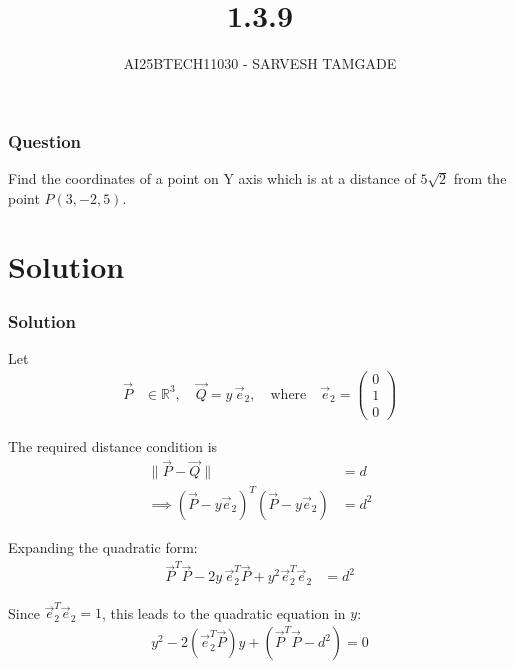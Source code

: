 \documentclass{beamer}
\title{1.3.9}
\author{AI25BTECH11030 - SARVESH TAMGADE}
\theoremstyle{remark}
\numberwithin{equation}{section}
\numberwithin{equation}{section}
\begin{document}
\begin{frame}
\titlepage
\end{frame}

\begin{frame}
\frametitle{Question}

Find the coordinates of a point on Y axis which is at a distance of \( 5\sqrt{2} \) from the point \( P(3, -2, 5) \).

\end{frame}

\section{Solution}

\begin{frame}
\frametitle{Solution}
Let 
\begin{align}
\vec{P} &\in \mathbb{R}^3, \quad \vec{Q} = y\,\vec{e}_2, \quad \text{where} \quad \vec{e}_2 = \begin{pmatrix} 0 \\ 1 \\ 0 \end{pmatrix}
\end{align}

The required distance condition is
\begin{align}
\|\vec{P} - \vec{Q}\| &= d \\
\implies (\vec{P} - y\vec{e}_2)^T (\vec{P} - y\vec{e}_2) &= d^2
\end{align}

Expanding the quadratic form:
\begin{align}
\vec{P}^T \vec{P} - 2y\,\vec{e}_2^T \vec{P} + y^2 \vec{e}_2^T \vec{e}_2 &= d^2
\end{align}

Since \(\vec{e}_2^T \vec{e}_2 = 1\), this leads to the quadratic equation in \( y \):
\begin{align}
y^2 - 2(\vec{e}_2^T \vec{P}) y + \left(\vec{P}^T \vec{P} - d^2\right) = 0
\end{align}


\end{frame}
\end{document}
